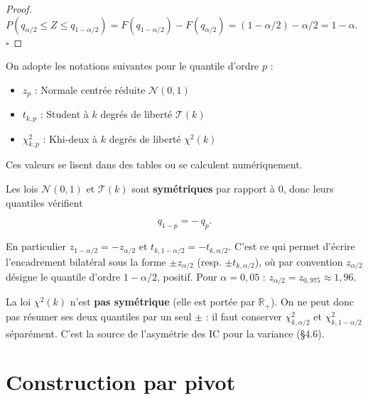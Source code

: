 \begin{proof}
$P(q_{\alpha/2} \le Z \le q_{1-\alpha/2}) = F(q_{1-\alpha/2}) - F(q_{\alpha/2}) = (1-\alpha/2) - \alpha/2 = 1-\alpha.$ $\square$
\end{proof}

\medskip

\begin{mdframed}
\begin{notation}
On adopte les notations suivantes pour le quantile d'ordre $p$ :

\begin{itemize}
\item $z_p$ :  Normale centrée réduite $\mathcal N(0,1)$
\item $t_{k,p}$ :  Student à $k$ degrés de liberté $\mathcal T(k)$
\item $\chi^2_{k,p}$ :  Khi-deux à $k$ degrés de liberté $\chi^2(k)$
\end{itemize}

Ces valeurs se lisent dans des tables ou se calculent numériquement.
\end{notation}
\end{mdframed}

\begin{remarque} 
Les lois $\mathcal N(0,1)$ et $\mathcal T(k)$ sont \textbf{symétriques} par rapport à $0$, donc leurs quantiles vérifient

$$
q_{1-p} = -\,q_p.
$$

En particulier $z_{1-\alpha/2} = -z_{\alpha/2}$ et $t_{k,1-\alpha/2} = -t_{k,\alpha/2}$. C'est ce qui permet d'écrire l'encadrement bilatéral sous la forme $\pm z_{\alpha/2}$ (resp. $\pm t_{k,\alpha/2}$), où par convention $z_{\alpha/2}$ désigne le quantile d'ordre $1-\alpha/2$, positif. Pour $\alpha = 0{,}05$ : $z_{\alpha/2} = z_{0{,}975} \approx 1{,}96$.
\end{remarque}

\begin{remarque} 
La loi $\chi^2(k)$ n'est \textbf{pas symétrique} (elle est portée par $\mathbb R_+$). On ne peut donc pas résumer ses deux quantiles par un seul $\pm$ : il faut conserver $\chi^2_{k,\alpha/2}$ et $\chi^2_{k,1-\alpha/2}$ séparément. C'est la source de l'asymétrie des IC pour la variance (§4.6).
\end{remarque}

\section{Construction par pivot}

